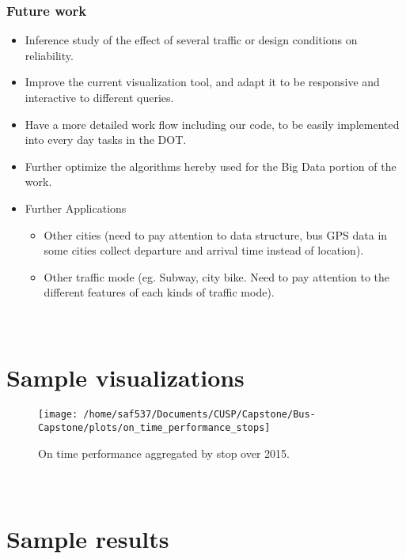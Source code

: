 \documentclass[12pt]{report}
\begin{document}
\subsubsection*{Future work}

\begin{itemize}
\item Inference study of the effect of several traffic or design conditions on reliability.
\item Improve the current visualization tool, and adapt it to be responsive and interactive to different queries.
\item Have a more detailed work flow including our code, to be easily implemented into every day tasks in the DOT.
\item Further optimize the algorithms hereby used for the Big Data portion of the work.
\item Further Applications
\begin{itemize}
\item Other cities (need to pay attention to data structure, bus GPS data in some cities collect departure and arrival time instead of location).
\item Other traffic mode (eg. Subway, city bike. Need to pay attention to the different features of each kinds of traffic mode).
\end{itemize}
\end{itemize}



\newpage
\appendix
\section*{\\Sample visualizations} \label{App:AppendixA}


\begin{figure}[!ht]
  \caption{On time performance aggregated by stop over 2015.}
  \centering
    \texttt{[image: /home/saf537/Documents/CUSP/Capstone/Bus-Capstone/plots/on\_time\_performance\_stops]}
\end{figure}

\newpage
\section*{\\Sample results} \label{App:AppendixB}

\end{document}
